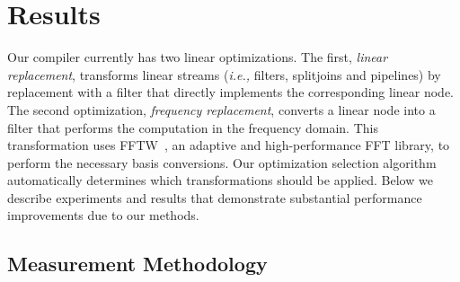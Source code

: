 \section{Results}
\label{sec:results}

Our compiler currently has two linear optimizations. The first, {\it
linear replacement}, transforms linear streams ({\it i.e.,} filters,
splitjoins and pipelines) by replacement with a filter that directly
implements the corresponding linear node.  The second optimization,
{\it frequency replacement}, converts a linear node into a filter that
performs the computation in the frequency domain.  This transformation
uses FFTW~\cite{frigo99fast}, an adaptive and high-performance FFT
library, to perform the necessary basis conversions.  Our optimization
selection algorithm automatically determines which transformations
should be applied.  Below we describe experiments and results that
demonstrate substantial performance improvements due to our methods.

\subsection{Measurement Methodology}


